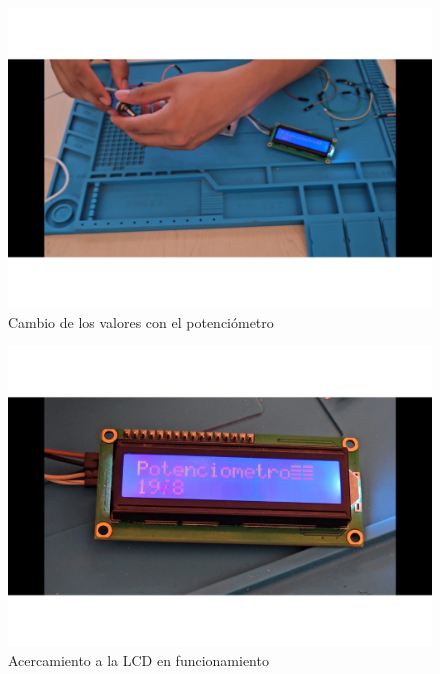     
    \begin{figure}[H]
        \centering
        \includegraphics[trim ={25mm 25mm 25mm 10mm},clip,scale=0.3]{22/Img/ev5.pdf}
        \caption{Cambio de los valores con el potenciómetro}
        \label{fig:ev5}
    \end{figure}
    
    \begin{figure}[H]
        \centering
        \includegraphics[trim = {25mm 25mm 25mm 10mm},clip,scale=0.3]{22/Img/ev6.pdf}
        \caption{Acercamiento a la LCD en funcionamiento}
        \label{fig:ev6}
    \end{figure}
    
    
    
